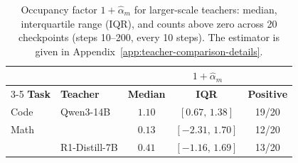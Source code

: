 \begin{table}[htbp]
  \centering
  \normalsize
  \caption{Occupancy factor $1+\widehat\alpha_m$ for larger-scale teachers:
  median, interquartile range (IQR), and counts above zero across 20
  checkpoints (steps 10--200, every 10 steps). The estimator is given in
  Appendix~\ref{app:teacher-comparison-details}.}
  \label{tab:occupancy-factor}
  \begin{tabular}{@{}llccc@{}}
    \toprule
    & & \multicolumn{3}{c}{$1+\widehat\alpha_m$} \\
    \cmidrule(l){3-5}
    \textbf{Task} & \textbf{Teacher} & \textbf{Median} & \textbf{IQR} & \textbf{Positive} \\
    \midrule
    Code & Qwen3-14B & $1.10$ & $[0.67,\,1.38]$ & 19/20 \\
    \midrule
    Math & \SkyworkTeacher{} & $0.13$ & $[-2.31,\,1.70]$ & 12/20 \\
         & R1-Distill-7B & $0.41$ & $[-1.16,\,1.69]$ & 13/20 \\
    \bottomrule
  \end{tabular}
\end{table}
